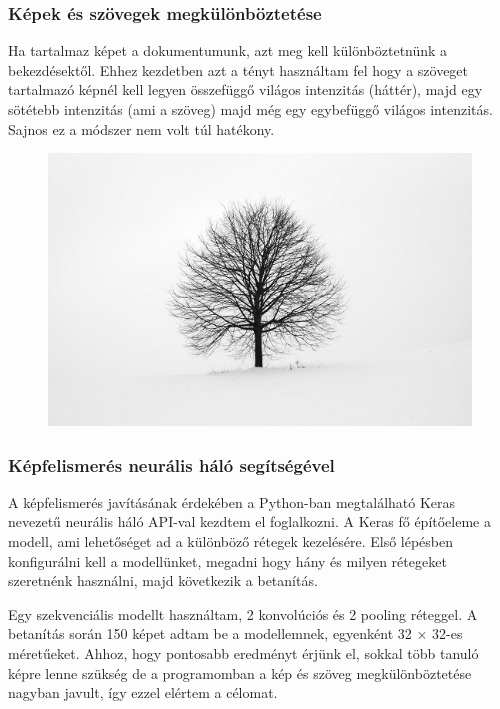 \documentclass{beamer}
\begin{document}
\begin{frame}[fragile]
\begin{figure}[!tbp]
\begin{minipage}[b]{0.3\textwidth}
  \end{minipage}
\end{figure}

\end{frame}

\begin{frame}[fragile]
\frametitle{Képek és szövegek megkülönböztetése}

 Ha tartalmaz képet a dokumentumunk, azt meg kell különböztetnünk a bekezdésektől. Ehhez kezdetben azt a tényt használtam fel hogy a szöveget tartalmazó képnél kell legyen összefüggő világos intenzitás (háttér), majd egy sötétebb intenzitás (ami a szöveg) majd még egy egybefüggő világos intenzitás. Sajnos ez a módszer nem volt túl hatékony.

\begin{figure}[!tbp]
  \centering
  \begin{minipage}[b]{0.45\textwidth}
    \includegraphics[width=\textwidth]{images/tree.png}
  \end{minipage}
\end{figure}

\end{frame}

\begin{frame}[fragile]
\frametitle{Képfelismerés neurális háló segítségével}

A képfelismerés javításának érdekében a Python-ban megtalálható Keras nevezetű neurális háló API-val kezdtem el foglalkozni.
A Keras fő építőeleme a modell, ami lehetőséget ad a különböző rétegek kezelésére.
Első lépésben konfigurálni kell a modellünket, megadni hogy hány és milyen rétegeket szeretnénk használni, majd következik a betanítás.

\bigskip

Egy szekvenciális modellt használtam, 2 konvolúciós és 2 pooling réteggel. A betanítás során 150 képet adtam be a modellemnek, egyenként 32 × 32-es méretűeket.
Ahhoz, hogy pontosabb eredményt érjünk el, sokkal több tanuló képre lenne szükség de a programomban a kép és szöveg megkülönböztetése nagyban javult, így ezzel elértem a célomat.

\end{frame}
\end{document}
